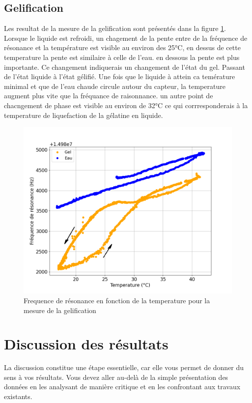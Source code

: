 \subsection{Gelification}
Les resultat de la mesure de la gelification sont présentés dans la figure \ref{fig:Frequence gelification}. 
Lorsque le liquide est refroidi,
un chagement de la pente entre de la fréquence de résonance et la température est visible au environ des 25°C, 
en dessus de cette temperature la pente est similaire à celle de l'eau. en dessous la pente est plus importante.  
Ce changement indiquerais un changement de l'état du gel. Passant de l'état liquide à l'état gélifié.
Une fois que le liquide à attein ca temérature minimal et que de l'eau chaude circule autour du capteur,
la temperature augment plus vite que la fréquance de raisonnance. un autre point de chacngement de phase est visible au environ de 32°C ce qui corrresponderais à la temperature de liquefaction de la gélatine en liquide.
\begin{figure}[H]
    \centering
    \includegraphics[width=\textwidth]{assets/figures/gel.png}
    \caption{Frequence de résonance en fonction de la temperature pour la mesure de la gelification}
    \label{fig:Frequence gelification}
\end{figure}
\section{Discussion des résultats}

La discussion constitue une étape essentielle, car elle vous permet de donner du sens à vos résultats. Vous devez aller au-delà de la simple présentation des données en les analysant de manière critique et en les confrontant aux travaux existants.

